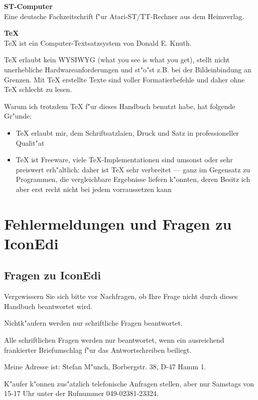 \begin{appendix}
{\bf ST-Computer} \\ 
Eine deutsche Fachzeitschrift f"ur Atari-ST/TT-Rechner aus dem
Heimverlag.

{\bf \TeX} \\ \index{\TeX}
{\TeX} ist ein Computer-Textsatzsystem von Donald E. Knuth.

{\TeX} erlaubt
kein WYSIWYG (what you see is what you get), stellt nicht 
unerhebliche Hardwareanforderungen und st"o"st z.B. bei der
Bildeinbindung an Grenzen. Mit {\TeX} erstellte Texte sind
voller Formatierbefehle und daher ohne {\TeX} schlecht zu lesen.

Warum ich trotzdem {\TeX} f"ur dieses Handbuch benutzt habe,
hat folgende Gr"unde:
\begin{itemize}
 \item {\TeX} erlaubt mir, dem Schriftsatzlaien, Druck und Satz in
  professioneller Qualit"at
 \item {\TeX} ist Freeware, viele {\TeX}-Implementationen sind umsonst
  oder sehr preiswert erh"altlich: daher ist {\TeX} sehr verbreitet
  --- ganz im Gegensatz zu Programmen, die vergleichbare Ergebnisse
  liefern k"onnten, deren Besitz ich aber erst recht nicht bei jedem 
  vorraussetzen kann
\end{itemize}


%
\setcounter{chapter}{5}
\chapter{Fehlermeldungen und Fragen zu IconEdi}
  

\section{Fragen zu IconEdi}

Vergewissern Sie sich bitte vor Nachfragen,
ob Ihre Frage nicht durch dieses Handbuch beantwortet 
wird.

Nichtk"aufern werden nur schriftliche Fragen beantwortet.

Alle schriftlichen Fragen werden nur beantwortet, wenn 
ein ausreichend frankierter Briefumschlag f"ur das 
Antwortschreiben beiliegt.

Meine Adresse ist: Stefan M"unch, Borbergstr. 38, D-47 Hamm 1.

K"aufer k"onnen zus"atzlich telefonische Anfragen stellen,
aber nur Samstags von 15-17 Uhr unter der Rufnummer
049-02381-23324.


\end{appendix}
